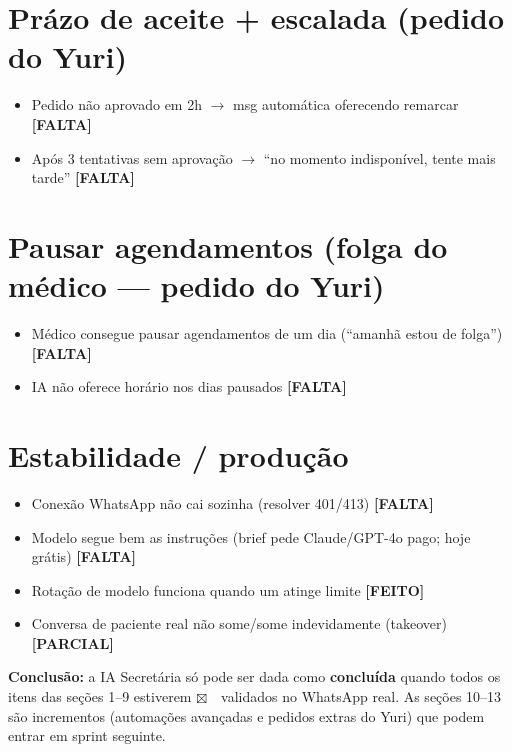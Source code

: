 \documentclass[11pt,a4paper]{article}
\newcommand{\done}{\textcolor{verde}{$\boxtimes$}\ }
\newcommand{\sok}{\textcolor{verde}{\textbf{[FEITO]}}}
\newcommand{\sparc}{\textcolor{ambar}{\textbf{[PARCIAL]}}}
\newcommand{\sfalta}{\textcolor{vermelho}{\textbf{[FALTA]}}}
\begin{document}
\section{Pr\'azo de aceite + escalada (pedido do Yuri)}
\begin{itemize}
  \item Pedido n\~ao aprovado em 2h $\rightarrow$ msg autom\'atica oferecendo remarcar \sfalta
  \item Ap\'os 3 tentativas sem aprova\c{c}\~ao $\rightarrow$ ``no momento indispon\'ivel, tente mais tarde'' \sfalta
\end{itemize}

\section{Pausar agendamentos (folga do m\'edico --- pedido do Yuri)}
\begin{itemize}
  \item M\'edico consegue pausar agendamentos de um dia (``amanh\~a estou de folga'') \sfalta
  \item IA n\~ao oferece hor\'ario nos dias pausados \sfalta
\end{itemize}

\section{Estabilidade / produ\c{c}\~ao}
\begin{itemize}
  \item Conex\~ao WhatsApp n\~ao cai sozinha (resolver 401/413) \sfalta
  \item Modelo segue bem as instru\c{c}\~oes (brief pede Claude/GPT-4o pago; hoje grátis) \sfalta
  \item Rota\c{c}\~ao de modelo funciona quando um atinge limite \sok
  \item Conversa de paciente real n\~ao some/some indevidamente (takeover) \sparc
\end{itemize}

\vspace{6pt}
\begin{tcolorbox}[colback=verde!5,colframe=verde!50,boxrule=0.5pt]
\small\textbf{Conclus\~ao:} a IA Secret\'aria s\'o pode ser dada como \textbf{conclu\'ida} quando todos os itens
das se\c{c}\~oes 1--9 estiverem \done\ validados no WhatsApp real. As se\c{c}\~oes 10--13 s\~ao incrementos
(automa\c{c}\~oes avan\c{c}adas e pedidos extras do Yuri) que podem entrar em sprint seguinte.
\end{tcolorbox}
\end{document}
